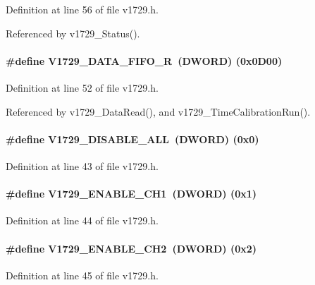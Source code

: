 Definition at line 56 of file v1729.h.

Referenced by v1729\_\-Status().
\paragraph[{V1729\_\-DATA\_\-FIFO\_\-R}]{\setlength{\rightskip}{0pt plus 5cm}\#define V1729\_\-DATA\_\-FIFO\_\-R~({\bf DWORD}) (0x0D00)}\hfill\label{v1729_8h_ac9c2a4bffcca10903d8362345ee27619}


Definition at line 52 of file v1729.h.

Referenced by v1729\_\-DataRead(), and v1729\_\-TimeCalibrationRun().
\paragraph[{V1729\_\-DISABLE\_\-ALL}]{\setlength{\rightskip}{0pt plus 5cm}\#define V1729\_\-DISABLE\_\-ALL~({\bf DWORD})   (0x0)}\hfill\label{v1729_8h_a4597f019a6389bfdc45ef336fe9fd592}


Definition at line 43 of file v1729.h.
\paragraph[{V1729\_\-ENABLE\_\-CH1}]{\setlength{\rightskip}{0pt plus 5cm}\#define V1729\_\-ENABLE\_\-CH1~({\bf DWORD})   (0x1)}\hfill\label{v1729_8h_a23479e8f5b1cfd29ea23cb63bfd673b9}


Definition at line 44 of file v1729.h.
\paragraph[{V1729\_\-ENABLE\_\-CH2}]{\setlength{\rightskip}{0pt plus 5cm}\#define V1729\_\-ENABLE\_\-CH2~({\bf DWORD})   (0x2)}\hfill\label{v1729_8h_ae5a69b04d8cef126961415af46c227b3}


Definition at line 45 of file v1729.h.
